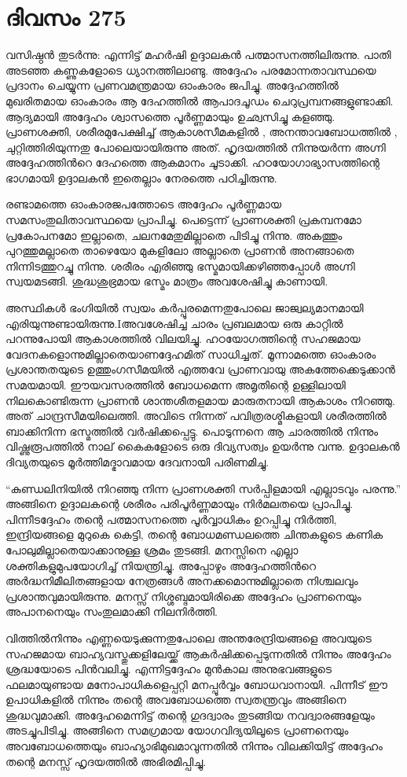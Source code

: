 \section{ദിവസം 275}


വസിഷ്ഠന്‍ തുടര്‍ന്നു: എന്നിട്ട് മഹര്‍ഷി ഉദ്ദാലകന്‍ പത്മാസനത്തിലിരുന്നു. പാതി അടഞ്ഞ കണ്ണുകളോടെ ധ്യാനത്തിലാണ്ടു. അദ്ദേഹം പരമോന്നതാവസ്ഥയെ പ്രദാനം ചെയ്യുന്ന പ്രണവമന്ത്രമായ ഓംകാരം ജപിച്ചു. അദ്ദേഹത്തില്‍ മുഖരിതമായ ഓംകാരം ആ ദേഹത്തില്‍ ആപാദചൂഡം ചെറുപ്രമ്പനങ്ങളുണ്ടാക്കി. ആദ്യമായി അദ്ദേഹം ശ്വാസത്തെ പൂര്‍ണ്ണമായും ഉഛ്വസിച്ചു കളഞ്ഞു. പ്രാണശക്തി, ശരീരമുപേക്ഷിച്ച് ആകാശസീമകളില്‍ , അനന്താവബോധത്തില്‍ , ചുറ്റിത്തിരിയുന്നതു പോലെയായിരുന്നു അത്. ഹൃദയത്തില്‍ നിന്നുയര്‍ന്ന അഗ്നി അദ്ദേഹത്തിന്‍റെ ദേഹത്തെ ആകമാനം ചൂടാക്കി. ഹഠയോഗാഭ്യാസത്തിന്റെ ഭാഗമായി ഉദ്ദാലകന്‍ ഇതെല്ലാം നേരത്തെ പഠിച്ചിരുന്നു.

രണ്ടാമത്തെ ഓംകാരജപത്തോടെ അദ്ദേഹം പൂര്‍ണ്ണമായ സമസംതുലിതാവസ്ഥയെ പ്രാപിച്ചു. പെട്ടെന്ന് പ്രാണശക്തി പ്രകമ്പനമോ പ്രകോപനമോ ഇല്ലാതെ, ചലനമേതുമില്ലാതെ പിടിച്ചു നിന്നു. അകത്തും പുറത്തുമല്ലാതെ താഴെയോ മുകളിലോ അല്ലാതെ പ്രാണന്‍ അനങ്ങാതെ നിന്നിടത്തുറച്ചു നിന്നു. ശരീരം എരിഞ്ഞു ഭസ്മമായിക്കഴിഞ്ഞപ്പോള്‍ അഗ്നി സ്വയമടങ്ങി. ശുദ്ധശുഭ്രമായ ഭസ്മം മാത്രം അവശേഷിച്ചു കാണായി.  

അസ്ഥികള്‍ ഭംഗിയില്‍ സ്വയം കര്‍പ്പൂരമെന്നതുപോലെ ജാജ്വല്യമാനമായി എരിയുന്നുണ്ടായിരുന്നു.Iഅവശേഷിച്ച ചാരം പ്രബലമായ ഒരു കാറ്റില്‍ പറന്നുപോയി ആകാശത്തില്‍ വിലയിച്ചു. ഹഠയോഗത്തിന്റെ സഹജമായ വേദനകളൊന്നുമില്ലാതെയാണദ്ദേഹമിത് സാധിച്ചത്. മൂന്നാമത്തെ ഓംകാരം പ്രശാന്തതയുടെ ഉത്തുംഗസീമയില്‍ എത്തവേ പ്രാണവായു അകത്തേക്കെടുക്കാന്‍ സമയമായി. ഈയവസരത്തില്‍ ബോധമെന്ന അമൃതിന്റെ ഉള്ളിലായി നിലകൊണ്ടിരുന്ന പ്രാണന്‍ ശാന്തശീതളമായ മാരുതനായി ആകാശം നിറഞ്ഞു. അത് ചാന്ദ്രസീമയിലെത്തി. അവിടെ നിന്നത് പവിത്രരശ്മികളായി ശരീരത്തില്‍ ബാക്കിനിന്ന ഭസ്മത്തില്‍ വര്‍ഷിക്കപ്പെട്ടു. പൊടുന്നനെ ആ ചാരത്തില്‍ നിന്നും വിഷ്ണുരൂപത്തില്‍ നാല് കൈകളോടെ ഒരു ദിവ്യസത്വം ഉയര്‍ന്നു വന്നു. ഉദ്ദാലകന്‍ ദിവ്യതയുടെ മൂര്‍ത്തിമദ്ഭാവമായ ദേവനായി പരിണമിച്ചു.  

“കുണ്ഡലിനിയില്‍ നിറഞ്ഞു നിന്ന പ്രാണശക്തി സര്‍പ്പിളമായി എല്ലാടവും പരന്നു.” അങ്ങിനെ ഉദ്ദാലകന്റെ ശരീരം പരിപൂര്‍ണ്ണമായും നിര്‍മലതയെ പ്രാപിച്ചു. പിന്നീടദ്ദേഹം തന്റെ പത്മാസനത്തെ പൂര്‍വ്വാധികം ഉറപ്പിച്ചു നിര്‍ത്തി, ഇന്ദ്രിയങ്ങളെ മുറുകെ കെട്ടി, തന്റെ ബോധമണ്ഡലത്തെ ചിന്തകളുടെ കണിക പോലുമില്ലാതെയാക്കാനുള്ള ശ്രമം തുടങ്ങി. മനസ്സിനെ എല്ലാ ശക്തികളുമുപയോഗിച്ച് നിയന്ത്രിച്ചു. അപ്പോഴും അദ്ദേഹത്തിന്‍റെ അര്‍ദ്ധനിമീലിതങ്ങളായ നേത്രങ്ങള്‍ അനക്കമൊന്നുമില്ലാതെ നിശ്ചലവും പ്രശാന്തവുമായിരുന്നു. മനസ്സ് നിശ്ശബ്ദമായിരിക്കെ അദ്ദേഹം പ്രാണനെയും അപാനനെയും സംതുലമാക്കി നിലനിര്‍ത്തി.   

വിത്തില്‍നിന്നും എണ്ണയെടുക്കുന്നതുപോലെ അന്തരേന്ദ്രിയങ്ങളെ അവയുടെ സഹജമായ ബാഹ്യവസ്തുക്കളിലേയ്ക്ക് ആകര്‍ഷിക്കപ്പെടുന്നതില്‍ നിന്നും അദ്ദേഹം ശ്രദ്ധയോടെ പിന്‍വലിച്ചു. എന്നിട്ടദ്ദേഹം മുന്‍കാല അനുഭവങ്ങളുടെ ഫലമായുണ്ടായ മനോപാധികളെപ്പറ്റി മനപ്പൂര്‍വ്വം ബോധവാനായി. പിന്നീട് ഈ ഉപാധികളില്‍ നിന്നും തന്റെ അവബോധത്തെ സ്വതന്ത്രവും അങ്ങിനെ ശുദ്ധവുമാക്കി. അദ്ദേഹമെന്നിട്ട് തന്റെ ഗുദദ്വാരം തുടങ്ങിയ നവദ്വാരങ്ങളേയും അടച്ചുപിടിച്ചു. അങ്ങിനെ സമഗ്രമായ യോഗവിദ്യയിലൂടെ പ്രാണനെയും അവബോധത്തെയും ബാഹ്യാഭിമുഖമാവുന്നതില്‍ നിന്നും വിലക്കിയിട്ട് അദ്ദേഹം തന്റെ മനസ്സ് ഹൃദയത്തില്‍ അഭിരമിപ്പിച്ചു.